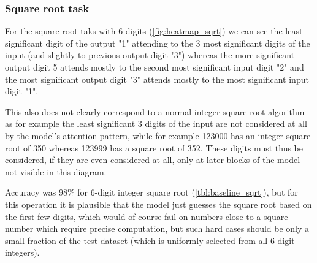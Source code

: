 \subsubsection{Square root task}


For the square root taks with 6 digits (\cref{fig:heatmap_sqrt}) we can see the least significant digit of the output "1" attending to the 3 most significant digits of the input (and slightly to previous output digit "3") whereas the more significant output digit 5 attends mostly to the second most significant input digit "2" and the most significant output digit "3" attends mostly to the most significant input digit "1".

This also does not clearly correspond to a normal integer square root algorithm as for example the least significant 3 digits of the input are not considered at all by the model's attention pattern, while for example 123000 has an integer square root of 350 whereas 123999 has a square root of 352. These digits must thus be considered, if they are even considered at all, only at later blocks of the model not visible in this diagram.

Accuracy was 98\% for 6-digit integer square root (\cref{tbl:baseline_sqrt}), but for this operation it is plausible that the model just guesses the square root based on the first few digits, which would of course fail on numbers close to a square number which require precise computation, but such hard cases should be only a small fraction of the test dataset (which is uniformly selected from all 6-digit integers).
